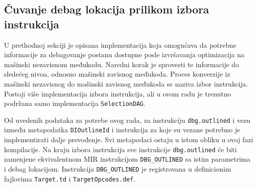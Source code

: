 \documentclass[12pt,oneside]{memoir}
\begin{document}
\subsection{Čuvanje debag lokacija prilikom izbora instrukcija}


U prethodnoj sekciji je opisana implementacija koja omogućava da potrebne informacije za debagovanje postanu dostupne posle izvršavanja optimizacija na mašinski nezavisnom međukodu.
Naredni korak je sprovesti te informacije do sledećeg nivoa, odnosno mašinski zavisnog međukoda.
Proces konverzije iz mašinski nezavisnog do mašinski zavisnog međukoda se naziva izbor instrukcija.
Postoji više implementacija izbora instrukcija, ali u ovom radu je trenutno podržana samo implementacija \verb|SelectionDAG|.

Od uvedenih podataka za potrebe ovog rada, za instrukciju \verb|dbg.outlined| i vezu između metapodatka \verb|DIOutlineId| i instrukcija za koje su vezane potrebno je implementirati dalje prevođenje.
Svi metapodaci ostaju u istom obliku u ovoj fazi kompilacije.
Na kraju izbora instrukcija sve instrukcije \verb|dbg.outlined| će biti zamenjene ekvivalentnom MIR instrukcijom \verb|DBG_OUTLINED| sa istim parametrima i debag lokacijom.
Instrukcija \verb|DBG_OUTLINED| je registrovana u definicionim fajlovima \verb|Target.td| i \verb|TargetOpcodes.def|.
\end{document}

